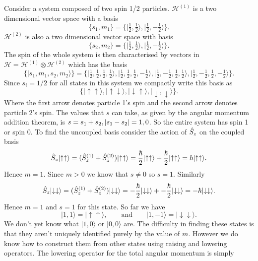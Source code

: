 \documentclass[a4paper]{article}
\renewcommand{\ket}[1]{\vert {#1} \rangle}
\newcommand{\hilbert}{\mathcal{H}}
\newcommand{\tensorProd}{\otimes}
\newcommand{\spinUp}{\uparrow}
\newcommand{\spinDown}{\downarrow}
\theoremstyle{definition}
\begin{document}
    \begin{example}
        Consider a system composed of two spin 1/2 particles.
        \(\hilbert^{(1)}\) is a two dimensional vector space with a basis
        \[\{s_1, m_1\} = \{\ket{\tfrac{1}{2}, \tfrac{1}{2}}, \ket{\tfrac{1}{2}, -\tfrac{1}{2}}\}.\]
        \(\hilbert^{(2)}\) is also a two dimensional vector space with basis
        \[\{s_2, m_2\} = \{\ket{\tfrac{1}{2}, \tfrac{1}{2}}, \ket{\tfrac{1}{2}, -\tfrac{1}{2}}\}.\]
        The spin of the whole system is then characterised by vectors in \(\hilbert = \hilbert^{(1)}\tensorProd\hilbert^{(2)}\) which has the basis
        \[\{\ket{s_1, m_1, s_2, m_2}\} = \{\ket{\tfrac{1}{2},\tfrac{1}{2},\tfrac{1}{2},\tfrac{1}{2}}, \ket{\tfrac{1}{2},\tfrac{1}{2},\tfrac{1}{2},-\tfrac{1}{2}}, \ket{\tfrac{1}{2},-\tfrac{1}{2},\tfrac{1}{2},\tfrac{1}{2}}, \ket{\tfrac{1}{2},-\tfrac{1}{2},\tfrac{1}{2},-\tfrac{1}{2}}\}.\]
        Since \(s_i = 1/2\) for all states in this system we compactly write this basis as
        \[\{\ket{\spinUp\spinUp}, \ket{\spinUp\spinDown}, \ket{\spinDown\spinUp}, \ket{\spinDown, \spinDown}\}.\]
        Where the first arrow denotes particle 1's spin and the second arrow denotes particle 2's spin.
        The values that \(s\) can take, as given by the angular momentum addition theorem, is \(s = s_1 + s_2, \abs{s_1 - s_2} = 1, 0\).
        So the entire system has spin 1 or spin 0.
        To find the uncoupled basis consider the action of \(\hat{S}_z\) on the coupled basis
        \[\operator{S}_z\ket{\spinUp\spinUp} = (\operator{S}^{(1)}_z + \operator{S}^{(2)}_z)\ket{\spinUp\spinUp} = \frac{\hbar}{2}\ket{\spinUp\spinUp} + \frac{\hbar}{2}\ket{\spinUp\spinUp} = \hbar\ket{\spinUp\spinUp}.\]
        Hence \(m = 1\).
        Since \(m > 0\) we know that \(s \ne 0\) so \(s = 1\).
        Similarly
        \[\operator{S}_z\ket{\spinDown\spinDown} = (\operator{S}^{(1)}_z + \operator{S}^{(2)}_z)\ket{\spinDown\spinDown} = -\frac{\hbar}{2}\ket{\spinDown\spinDown} + -\frac{\hbar}{2}\ket{\spinDown\spinDown} = -\hbar\ket{\spinDown\spinDown}.\]
        Hence \(m = 1\) and \(s = 1\) for this state.
        So far we have
        \[\ket{1,1} = \ket{\spinUp\spinUp}, \qquad\text{and}\qquad \ket{1,-1} = \ket{\spinDown\spinDown}.\]
        We don't yet know what \(\ket{1, 0}\) or \(\ket{0, 0}\) are.
        The difficulty in finding these states is that they aren't uniquely identified purely by the value of \(m\).
        However we do know how to construct them from other states using raising and lowering operators.
        The lowering operator for the total angular momentum is simply

\end{example}
\end{document}
